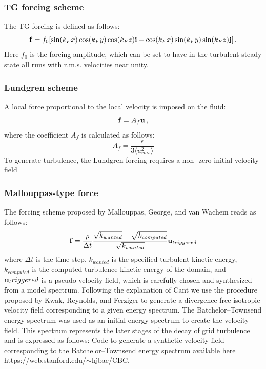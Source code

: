 \documentclass[11pt]{article}
\begin{document}
\subsubsection{TG forcing scheme}
The TG forcing is defined as follows:
\begin{equation}
{\bf f} = f_0 [ \sin (k_F x)  \cos (k_F y) \cos(k_F z) {\bf i}  - \cos (k_F x) \sin (k_F y) \sin (k_F z) {\bf j}] \, ,
\end{equation}
Here $f_0$ is the forcing amplitude, which can be set to have in the turbulent steady state all runs with r.m.s. velocities near unity.

\subsubsection{Lundgren scheme}
A local force proportional to the local velocity is imposed on the fluid:
\begin{equation}
{\bf f} = A_f {\bf u}\, ,
\end{equation}
where the coefficient $A_f$ is calculated as follows:
\begin{equation}
A_f = \frac{\epsilon}{3 \langle u_{rms}^2 \rangle }
\end{equation}
To generate turbulence, the Lundgren forcing requires a non- zero initial velocity field



\subsubsection{Mallouppas-type force}

The forcing scheme proposed by Mallouppas, George, and van Wachem reads as follows:
\begin{equation}
{\bf f} = \frac{\rho}{\Delta t} \frac{\sqrt{k_{wanted}} - \sqrt{k_{computed}} }{\sqrt{k_{wanted}}}{\bf u}_{triggered}
\end{equation}
where $\Delta t$ is the time step, $k_{wanted}$ is the specified turbulent kinetic energy, $k_{computed}$ is the computed turbulence kinetic energy of the domain, and ${\bf u}_triggered$ is a pseudo-velocity field, which is
carefully chosen and synthesized from a model spectrum.
Following the explanation of Cant we use the procedure proposed by Kwak, Reynolds, and Ferziger to generate a divergence-free isotropic velocity field corresponding to a given energy spectrum. 
The Batchelor–Townsend energy spectrum was used as an initial energy spectrum to create the velocity field. 
This spectrum represents the later stages of the decay of grid turbulence and is expressed as follows:
Code to generate a synthetic velocity field corresponding to the Batchelor–Townsend energy spectrum available here https://web.stanford.edu/$\sim$hjbae/CBC.
\end{document}
